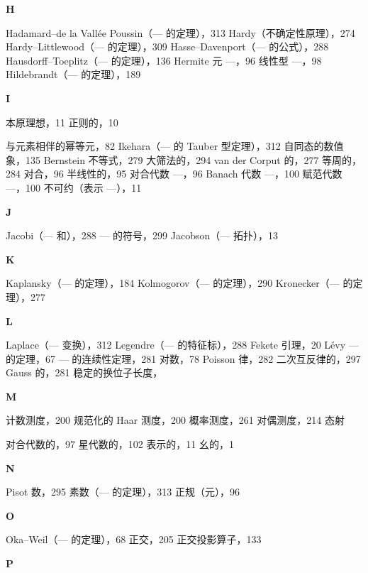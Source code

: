 \textbf{H}

Hadamard--de la Vallée Poussin（--- 的定理），313 Hardy（不确定性原理），274 Hardy--Littlewood（--- 的定理），309 Hasse--Davenport（--- 的公式），288 Hausdorff--Toeplitz（--- 的定理），136 Hermite 元 ---，96 线性型 ---，98 Hildebrandt（--- 的定理），189

\textbf{I}

本原理想，11 正则的，10

与元素相伴的幂等元，82 Ikehara（--- 的 Tauber 型定理），312 自同态的数值象，135 Bernstein 不等式，279 大筛法的，294 van der Corput 的，277 等周的，284 对合，96 半线性的，95 对合代数 ---，96 Banach 代数 ---，100 赋范代数 ---，100 不可约（表示 ---），11

\textbf{J}

Jacobi（--- 和），288 --- 的符号，299 Jacobson（--- 拓扑），13

\textbf{K}

Kaplansky（--- 的定理），184 Kolmogorov（--- 的定理），290 Kronecker（--- 的定理），277

\textbf{L}

Laplace（--- 变换），312 Legendre（--- 的特征标），288 Fekete 引理，20 Lévy --- 的定理，67 --- 的连续性定理，281 对数，78 Poisson 律，282 二次互反律的，297 Gauss 的，281 稳定的换位子长度，

\textbf{M}

计数测度，200 规范化的 Haar 测度，200 概率测度，261 对偶测度，214 态射

对合代数的，97 星代数的，102 表示的，11 幺的，1

\textbf{N}

Pisot 数，295 素数（--- 的定理），313 正规（元），96

\textbf{O}

Oka--Weil（--- 的定理），68 正交，205 正交投影算子，133

\textbf{P}


